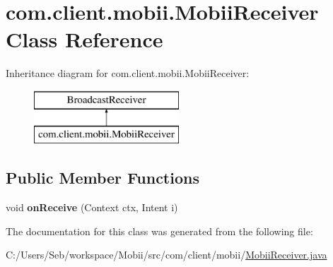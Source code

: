 \hypertarget{classcom_1_1client_1_1mobii_1_1_mobii_receiver}{\section{com.\-client.\-mobii.\-Mobii\-Receiver Class Reference}
\label{classcom_1_1client_1_1mobii_1_1_mobii_receiver}
}
Inheritance diagram for com.\-client.\-mobii.\-Mobii\-Receiver\-:\begin{figure}[H]
\begin{center}
\leavevmode
\includegraphics[height=2.000000cm]{classcom_1_1client_1_1mobii_1_1_mobii_receiver}
\end{center}
\end{figure}
\subsection*{Public Member Functions}
\begin{DoxyCompactItemize}
\item 
\hypertarget{classcom_1_1client_1_1mobii_1_1_mobii_receiver_aef7f781786f72c190df0de1a097cd8be}{void {\bfseries on\-Receive} (Context ctx, Intent i)}\label{classcom_1_1client_1_1mobii_1_1_mobii_receiver_aef7f781786f72c190df0de1a097cd8be}

\end{DoxyCompactItemize}


The documentation for this class was generated from the following file\-:\begin{DoxyCompactItemize}
\item 
C\-:/\-Users/\-Seb/workspace/\-Mobii/src/com/client/mobii/\hyperlink{_mobii_receiver_8java}{Mobii\-Receiver.\-java}\end{DoxyCompactItemize}
